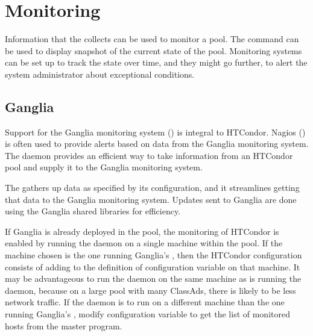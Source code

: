 \section{\label{sec:Monitoring}Monitoring}

Information that
the  collects can be used to monitor a pool.
The  command can be used to display
snapshot of the current state of the pool.
Monitoring systems can be set up to track the state over time,
and they might go further, 
to alert the system administrator about exceptional conditions.


\subsection{\label{sec:monitor-ganglia}Ganglia}

Support for the Ganglia monitoring system ()
is integral to HTCondor.
Nagios ()
is often used to provide alerts based on data from the Ganglia
monitoring system.
The  daemon provides an efficient way to take information from
an HTCondor pool and supply it to the Ganglia monitoring system.

The  gathers up data as specified by its configuration,
and it streamlines getting that data to the Ganglia monitoring
system.
Updates sent to Ganglia are done using the Ganglia shared libraries for
efficiency.

If Ganglia is already deployed in the pool,
the monitoring of HTCondor is enabled by running the  daemon
on a single machine within the pool.
If the machine chosen is the one running Ganglia's ,
then the HTCondor configuration consists of
adding  to the definition of configuration
variable  on that machine.
It may be advantageous to run the  daemon
on the same machine as is running the  daemon,
because on a large pool with many ClassAds,
there is likely to be less network traffic.
If the  daemon is to run on a different machine
than the one running Ganglia's ,
modify configuration variable  to get the
list of monitored hosts from the master  program.

